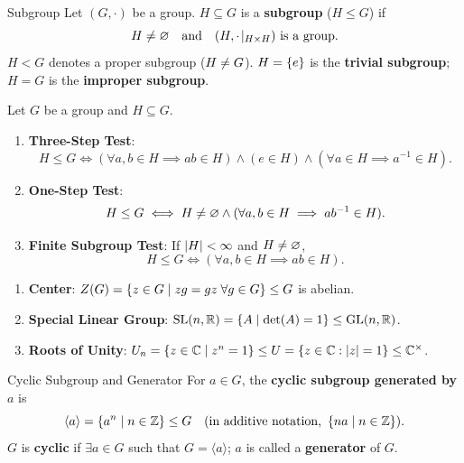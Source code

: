 \documentclass[12pt,a4paper]{article}
\begin{document}
    \begin{defi}{Subgroup}
        Let $(G, \cdot)$ be a group. $H \subseteq G$ is a \textbf{subgroup} ($H \le G$) if
        \[
            H \neq \varnothing \quad\text{and}\quad (H, \cdot\!\mid_{H \times H}) \text{ is a group}.
        \]
        $H < G$ denotes a proper subgroup ($H \neq G$). $H = \left\{ e \right\}$ is the \textbf{trivial subgroup}; $H = G$ is the \textbf{improper subgroup}.
    \end{defi}
    
    \begin{thm}
        Let $G$ be a group and $H \subseteq G$.
        \begin{enumerate}
            \item \textbf{Three-Step Test}:
            \[
                H \le G \iff (\forall a,b \in H \implies ab \in H) \land (e \in H) \land (\forall a \in H \implies a^{-1} \in H).
            \]
            \item \textbf{One-Step Test}:
            \[
                H \le G \iff H \neq \varnothing \land (\forall a,b \in H \implies ab^{-1} \in H).
            \]
            \item \textbf{Finite Subgroup Test}: If $\left\lvert H \right\rvert < \infty$ and $H \neq \varnothing$,
            \[
                H \le G \iff (\forall a, b \in H \implies ab \in H).
            \]
        \end{enumerate}
    \end{thm}
    
    \begin{eg}
        \begin{enumerate}
            \item \textbf{Center}: $Z(G) = \left\{ z \in G \mid zg = gz \; \forall g \in G \right\} \le G$ is abelian.
            \item \textbf{Special Linear Group}: $\operatorname{SL}(n, \mathbb{R}) = \left\{ A \mid \det(A) = 1 \right\} \le \operatorname{GL}(n, \mathbb{R})$.
            \item \textbf{Roots of Unity}: $U_n = \left\{ z \in \mathbb{C} \mid z^n = 1 \right\} \le U = \left\{ z \in \mathbb{C} : \left\lvert z \right\rvert = 1 \right\} \le \mathbb{C}^\times$.
        \end{enumerate}
    \end{eg}
    \bigskip
    
    \begin{defi}{Cyclic Subgroup and Generator}
        For $a \in G$, the \textbf{cyclic subgroup generated by $a$} is
        \[
            \langle a \rangle = \left\{ a^n \mid n \in \mathbb{Z} \right\} \le G \quad (\text{in additive notation, } \left\{ na \mid n \in \mathbb{Z} \right\}).
        \]
        $G$ is \textbf{cyclic} if $\exists a \in G$ such that $G = \langle a \rangle$; $a$ is called a \textbf{generator} of $G$.
    \end{defi}
    \bigskip
    
\end{document}
